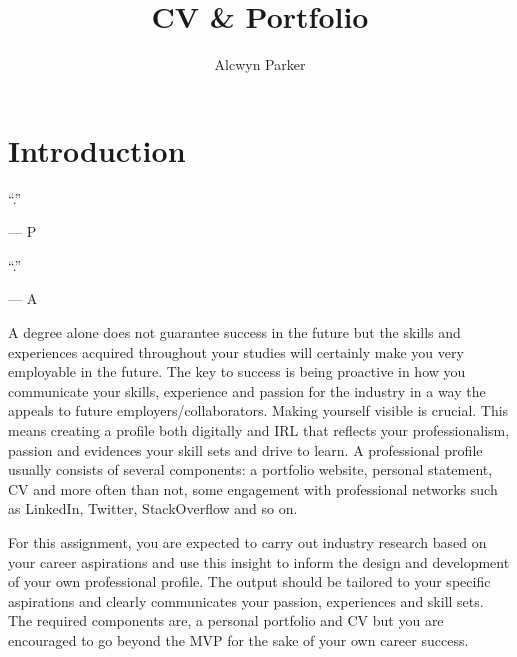 \documentclass{../../fal_assignment}
\title{CV \& Portfolio}
\author{Alcwyn Parker}
\begin{document}
\maketitle

\section*{Introduction}

\begin{marginquote}
``.''

--- P

    \marginquoterule

``.''

--- A

\end{marginquote}


A degree alone does not guarantee success in the future but the skills and experiences acquired throughout your studies will certainly make you very employable in the future. The key to success is being proactive in how you communicate your skills, experience and passion for the industry in a way the appeals to future employers/collaborators. Making yourself visible is crucial. This means creating a profile both digitally and IRL that reflects your 
professionalism, passion and evidences your skill sets and drive to learn. A professional profile usually consists of several components: a portfolio website, personal statement, CV and more often than not, some engagement with professional networks such as LinkedIn, Twitter, StackOverflow and so on. 

For this assignment, you are expected to carry out industry research based on your career aspirations and use this insight to inform the design and development of your own professional profile. The output should be tailored to your specific aspirations and clearly communicates your passion, experiences and skill sets. The required components are, a personal portfolio and CV but you are encouraged to go beyond the MVP for the sake of your own career success. 
\end{document}
